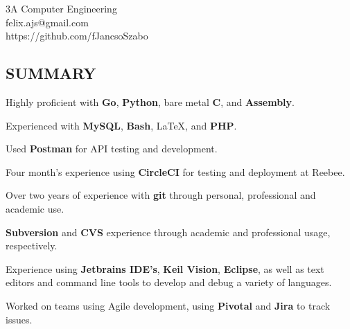 \documentclass[margin,line]{resume}
\begin{document}
{
    \hfill 3A Computer Engineering \vspace{0mm} \\\vspace{0mm}
    \hfill felix.ajs@gmail.com       \vspace{0mm}\\\vspace{0mm}
    \hfill https://github.com/fJancsoSzabo \vspace{0mm}\\\vspace{-9mm}
}

\begin{resume}

    \section{\mysidestyle \textbf{\large{S}\small{UMMARY}}}

    \begin{tightemizenoindent}
    \item Highly proficient with \textbf{Go}, \textbf{Python}, bare metal \textbf{C}, and \textbf{Assembly}.
    \item Experienced with \textbf{MySQL}, \textbf{Bash}, \LaTeX, and \textbf{PHP}.
    \item Used \textbf{Postman} for API testing and development.
    \item Four month's experience using \textbf{CircleCI} for testing and deployment at Reebee.
    \item Over two years of experience with \textbf{git} through personal, professional and academic use.
    \item \textbf{Subversion} and \textbf{CVS} experience through academic and professional usage, respectively.
    \item Experience using \textbf{Jetbrains IDE's}, \textbf{Keil \pmb{\si\micro}Vision}, \textbf{Eclipse}, as well as text editors and command line tools to develop and debug a variety of languages.
    \item Worked on teams using Agile development, using \textbf{Pivotal} and \textbf{Jira} to track issues.
    \end{tightemizenoindent}

    \vspace{-1mm}


\end{resume}
\end{document}
